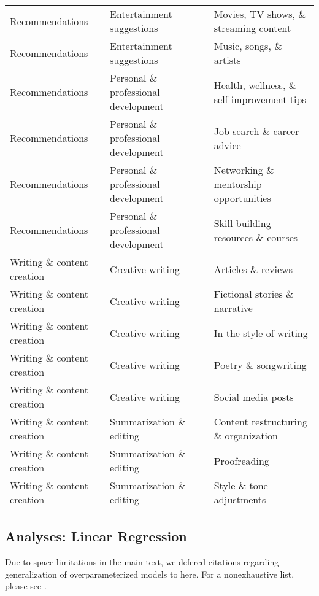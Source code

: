 \begin{longtable}{|l|l|l|}
Recommendations & Entertainment suggestions & Movies, TV shows, \& streaming content \\
Recommendations & Entertainment suggestions & Music, songs, \& artists \\
Recommendations & Personal \& professional development & Health, wellness, \& self-improvement tips \\
Recommendations & Personal \& professional development & Job search \& career advice \\
Recommendations & Personal \& professional development & Networking \& mentorship opportunities \\
Recommendations & Personal \& professional development & Skill-building resources \& courses \\
Writing \& content creation & Creative writing & Articles \& reviews \\
Writing \& content creation & Creative writing & Fictional stories \& narrative \\
Writing \& content creation & Creative writing & In-the-style-of writing \\
Writing \& content creation & Creative writing & Poetry \& songwriting \\
Writing \& content creation & Creative writing & Social media posts \\
Writing \& content creation & Summarization \& editing & Content restructuring \& organization \\
Writing \& content creation & Summarization \& editing & Proofreading \\
Writing \& content creation & Summarization \& editing & Style \& tone adjustments \\
\hline
\end{longtable}


\subsection{Analyses: Linear Regression}
\label{app:sec:generalization_of_overparameterized_models}

Due to space limitations in the main text, we defered citations regarding generalization of overparameterized models to here. For a nonexhaustive list, please see \citet{vallet1989hebb,krogh1991simple,geman1992neural,krogh1992generalization,opper1995statistical,duin2000classifiers, spigler2018jamming, belkin2019reconciling, bartlett2020benign, belkin2020twomodels, nakkiran2021deep, poggio2019double, advani2020high, liang2020just, adlam2020understanding, rocks2022memorizing, rocks2021geometry, rocks2022bias, mei2022generalization, hastie2022surprises, bach2023highdimensional,schaeffer2023double, schaeffer2023divergence, curth2024u, schaeffer2024doubledescentdemystified}.


